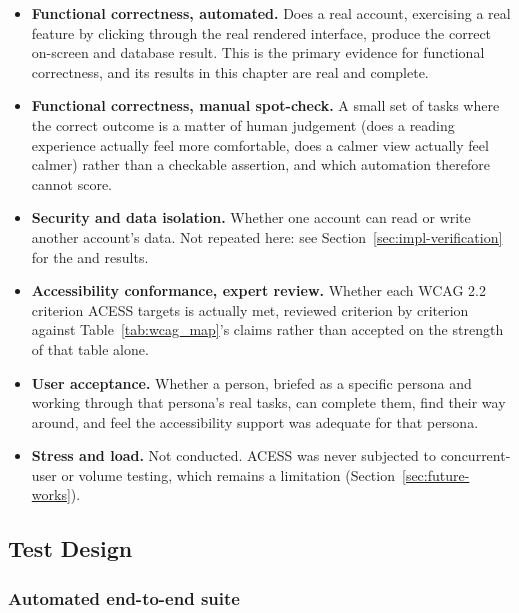 \documentclass[12pt, oneside]{article} %
\newcommand{\tcode}[1]{\path{#1}}
\begin{document}
\begin{itemize}
    \item \textbf{Functional correctness, automated.} Does a real account, exercising a real feature by clicking through the real rendered interface, produce the correct on-screen and database result. This is the primary evidence for functional correctness, and its results in this chapter are real and complete.
    \item \textbf{Functional correctness, manual spot-check.} A small set of tasks where the correct outcome is a matter of human judgement (does a reading experience actually feel more comfortable, does a calmer view actually feel calmer) rather than a checkable assertion, and which automation therefore cannot score.
    \item \textbf{Security and data isolation.} Whether one account can read or write another account's data. Not repeated here: see Section~\ref{sec:impl-verification} for the \tcode{verify:rls} and \tcode{verify:scenarios} results.
    \item \textbf{Accessibility conformance, expert review.} Whether each WCAG 2.2 criterion ACESS targets is actually met, reviewed criterion by criterion against Table~\ref{tab:wcag_map}'s claims rather than accepted on the strength of that table alone.
    \item \textbf{User acceptance.} Whether a person, briefed as a specific persona and working through that persona's real tasks, can complete them, find their way around, and feel the accessibility support was adequate for that persona.
    \item \textbf{Stress and load.} Not conducted. ACESS was never subjected to concurrent-user or volume testing, which remains a limitation (Section~\ref{sec:future-works}).
\end{itemize}

\subsection{Test Design}

\subsubsection{Automated end-to-end suite}
\label{sec:automated-suite}
\end{document}
